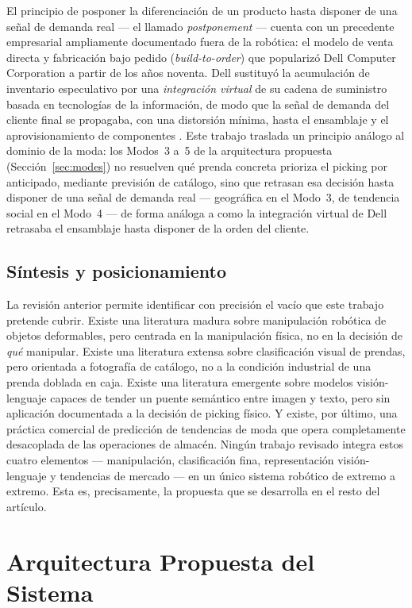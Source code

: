 \documentclass[conference]{IEEEtran}
\begin{document}
El principio de posponer la diferenciación de un producto hasta disponer de
una señal de demanda real --- el llamado \emph{postponement} --- cuenta con
un precedente empresarial ampliamente documentado fuera de la robótica: el
modelo de venta directa y fabricación bajo pedido (\emph{build-to-order})
que popularizó Dell Computer Corporation a partir de los años noventa. Dell
sustituyó la acumulación de inventario especulativo por una
\emph{integración virtual} de su cadena de suministro basada en tecnologías
de la información, de modo que la señal de demanda del cliente final se
propagaba, con una distorsión mínima, hasta el ensamblaje y el
aprovisionamiento de componentes \cite{magretta1998virtual}. Este trabajo
traslada un principio análogo al dominio de la moda: los Modos~3 a~5 de la
arquitectura propuesta (Sección~\ref{sec:modes}) no resuelven qué prenda
concreta prioriza el picking por anticipado, mediante previsión de
catálogo, sino que retrasan esa decisión hasta disponer de una señal de
demanda real --- geográfica en el Modo~3, de tendencia social en el
Modo~4 --- de forma análoga a como la integración virtual de Dell retrasaba
el ensamblaje hasta disponer de la orden del cliente.

\subsection{Síntesis y posicionamiento}

La revisión anterior permite identificar con precisión el vacío que este
trabajo pretende cubrir. Existe una literatura madura sobre manipulación
robótica de objetos deformables, pero centrada en la manipulación física, no
en la decisión de \emph{qué} manipular. Existe una literatura extensa sobre
clasificación visual de prendas, pero orientada a fotografía de catálogo, no
a la condición industrial de una prenda doblada en caja. Existe una
literatura emergente sobre modelos visión-lenguaje capaces de tender un
puente semántico entre imagen y texto, pero sin aplicación documentada a la
decisión de picking físico. Y existe, por último, una práctica comercial de
predicción de tendencias de moda que opera completamente desacoplada de las
operaciones de almacén. Ningún trabajo revisado integra estos cuatro
elementos --- manipulación, clasificación fina, representación
visión-lenguaje y tendencias de mercado --- en un único sistema robótico de
extremo a extremo. Esta es, precisamente, la propuesta que se desarrolla en
el resto del artículo.

\section{Arquitectura Propuesta del Sistema}
\label{sec:arch}
\end{document}

